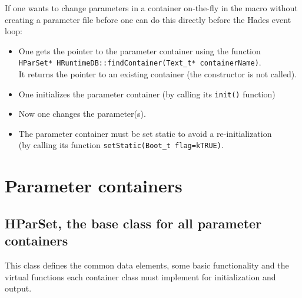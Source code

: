 If one wants to change parameters in a container on-the-fly in the macro without creating a parameter file before 
one can do this directly before the Hades event loop:
\begin{itemize}
  \setlength{\itemsep}{0pt}    
  \item One gets the pointer to the parameter container using the function\\
        \verb+HParSet* HRuntimeDB::findContainer(Text_t* containerName)+.\\
        It returns the pointer to an existing container (the constructor is not called).
  \item One initializes the parameter container (by calling its \verb+init()+ function)
  \item Now one changes the parameter(s).
  \item The parameter container must be set static to avoid a re-initialization\\ 
        (by calling its function \verb+setStatic(Boot_t flag=kTRUE)+.
\end{itemize}


\section[Parameter containers]{Parameter containers} \label{sec:rtdbParamContainers}

%

\subsection[Base class HParSet]{HParSet, the base class for all parameter containers} \label{sec:rtdbHParSet}

This class defines the common data elements, some basic functionality and the virtual functions each container class must 
implement for initialization and output.

